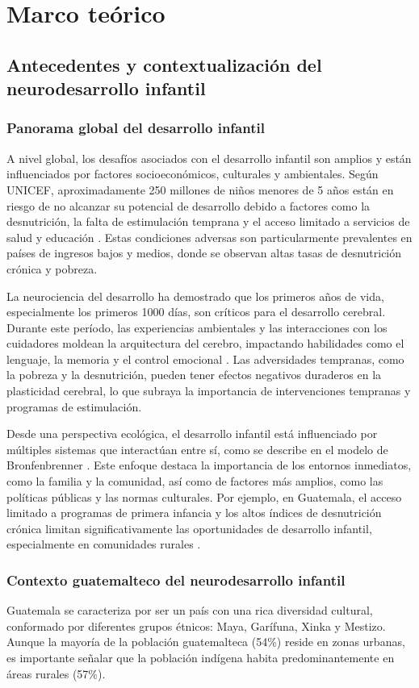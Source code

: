 \documentclass[11pt,letterpaper]{report}
\begin{document}
	\chapter{Marco teórico}
\section{Antecedentes y contextualización del neurodesarrollo infantil}
\subsection{Panorama global del desarrollo infantil}
A nivel global,  los desafíos asociados con el desarrollo infantil son amplios
y están influenciados por factores socioeconómicos, culturales y ambientales.
Según UNICEF, aproximadamente 250 millones de niños menores de 5 años están en 
riesgo de no alcanzar su potencial de desarrollo debido a factores como la 
desnutrición, la falta de estimulación temprana y el acceso limitado a 
servicios de salud y educación \cite{UNICEF2023}. Estas condiciones adversas 
son particularmente prevalentes en países de ingresos bajos y medios, donde se 
observan altas tasas de desnutrición crónica y pobreza.

La neurociencia del desarrollo ha demostrado que los primeros años de vida, 
especialmente los primeros 1000 días, son críticos para el desarrollo cerebral. 
Durante este período, las experiencias ambientales y las interacciones con los 
cuidadores moldean la arquitectura del cerebro, impactando habilidades como el 
lenguaje, la memoria y el control emocional \cite{Stiles2010}. Las adversidades 
tempranas, como la pobreza y la desnutrición, pueden tener efectos negativos 
duraderos en la plasticidad cerebral, lo que subraya la importancia de 
intervenciones tempranas y programas de estimulación.

Desde una perspectiva ecológica, el desarrollo infantil está influenciado por 
múltiples sistemas que interactúan entre sí, como se describe en el modelo de 
Bronfenbrenner \cite{Bronfenbrenner2005}. Este enfoque destaca la importancia 
de los entornos inmediatos, como la familia y la comunidad, así como de 
factores más amplios, como las políticas públicas y las normas culturales. Por 
ejemplo, en Guatemala, el acceso limitado a programas de primera infancia y los 
altos índices de desnutrición crónica limitan significativamente las 
oportunidades de desarrollo infantil, especialmente en comunidades rurales 
\cite{SESAN2022}.

\subsection{Contexto guatemalteco del neurodesarrollo infantil}
Guatemala se caracteriza por ser un país con una rica diversidad cultural,
conformado por diferentes grupos étnicos: Maya, Garífuna, Xinka y Mestizo. 
Aunque la mayoría de la población guatemalteca (54\%) reside en zonas urbanas,
es importante señalar que la población indígena habita predominantemente en
áreas rurales (57\%). \cite{PoliticaInfanciaGuate}
\end{document}
